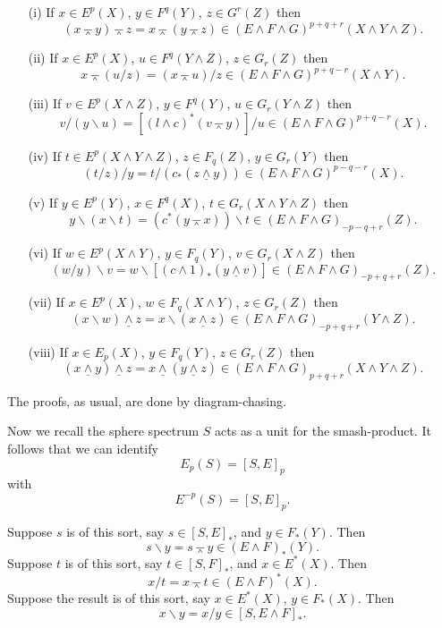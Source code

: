 \documentclass[../main]{subfiles}
\begin{document}
\begin{theorem}\label{thm:p3ch09.4}
\begin{enumerate}
    \item[(i)] If $x \in E^p(X)$, $y \in F^q(Y)$, $z \in G^r(Z)$ then $$(x \barwedge y) \barwedge z = x \barwedge (y \barwedge z) \in (E \wedge F \wedge G)^{p + q + r}(X \wedge Y \wedge Z).$$
    \item[(ii)] If $x \in E^p(X)$, $u \in F^q(Y \wedge Z)$, $z \in G_r(Z)$ then $$x \barwedge (u/z) = (x \barwedge u)/z \in (E \wedge F \wedge G)^{p + q - r}(X \wedge Y).$$
    \item[(iii)] If $v \in E^p(X \wedge Z)$, $y \in F^q(Y)$, $u \in G_r(Y \wedge Z)$ then $$v/(y \backslash u) = [(l \wedge c)^\ast(v \barwedge y)]/u \in (E \wedge F \wedge G)^{p + q - r}(X).$$
    \item[(iv)] If $t \in E^p(X \wedge Y \wedge Z)$, $z \in F_q(Z)$, $y \in G_r(Y)$ then $$(t/z)/y = t/(c_\ast(z \underline \wedge y)) \in (E \wedge F \wedge G)^{p - q - r}(X).$$
    \item[(v)] If $y \in E^p(Y)$, $x \in F^q(X)$, $t \in G_r(X \wedge Y \wedge Z)$ then $$y \backslash (x \backslash t) = (c^\ast(y \barwedge x)) \backslash t \in (E \wedge F \wedge G)_{-p - q + r}(Z).$$
    \item[(vi)] If $w \in E^p(X \wedge Y)$, $y \in F_q(Y)$, $v \in G_r(X \wedge Z)$ then $$(w/y)\backslash v = w \backslash [(c \wedge 1)_\ast (y \underline \wedge v)] \in (E \wedge F \wedge G)_{-p + q + r}(Z).$$
    \item[(vii)] If $x \in E^p(X)$, $w \in F_q(X \wedge Y)$, $z \in G_r(Z)$ then $$(x \backslash w) \underline \wedge z = x \backslash (x \underline \wedge z) \in (E \wedge F \wedge G)_{-p + q + r}(Y \wedge Z).$$
    \item [(viii)] If $x \in E_p(X)$, $y \in F_q(Y)$, $z \in G_r(Z)$ then $$(x \underline \wedge y) \underline \wedge z = x \underline \wedge (y \underline \wedge z) \in (E \wedge F \wedge G)_{p + q + r}(X \wedge Y \wedge Z).$$
\end{enumerate}
\end{theorem}

The proofs, as usual, are done by diagram-chasing. 

Now we recall the sphere spectrum $S$ acts as a unit for the smash-product. It follows that we can identify $$E_p(S) = [S, E]_p$$ with $$E^{-p}(S) = [S, E]_p.$$

\begin{proposition}\label{prop:p3ch09.5}
Suppose $s$ is of this sort, say $s \in [S, E]_\ast$, and $y \in F_\ast(Y)$. Then $$s \backslash y = s \barwedge y \in (E \wedge F)_\ast(Y).$$ Suppose $t$ is of this sort, say $t \in [S, F]_\ast$, and $x \in E^\ast(X)$. Then $$x/t = x \barwedge t \in (E \wedge F)^\ast(X).$$ Suppose the result is of this sort, say $x \in E^\ast(X)$, $y \in F_\ast(X)$. Then $$x \backslash y = x/y \in [S, E \wedge F]_\ast.$$
\end{proposition}
\end{document}
